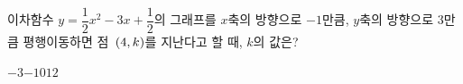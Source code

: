 이차함수 $y=\dfrac{1}{2}x^2-3x+\dfrac{1}{2}$의 그래프를 $x$축의 방향으로 $-1$만큼, $y$축의 방향으로 $3$만큼 평행이동하면 점~$(4{,}\mkern3mu k)$를 지난다고 할 때, $k$의 값은?
\begin{choices32}{$-3$}{$-1$}{$0$}{$1$}{$2$}\end{choices32}
